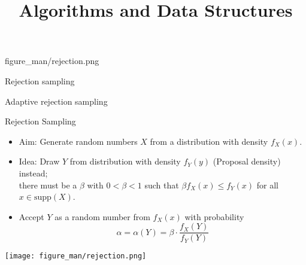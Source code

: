 \documentclass[11pt,compress,t,notes=noshow, xcolor=table]{beamer}
\title{Algorithms and Data Structures}
\begin{document}
{figure_man/rejection.png}
{
  \item Rejection sampling
  \item Adaptive rejection sampling
}

\begin{vbframe}{Rejection Sampling}
\begin{itemize}
\item Aim: Generate random numbers $X$ from a distribution with density $f_X(x)$.
\item Idea: Draw $Y$ from distribution with density $f_Y(y)$ (Proposal density) instead; \\
 there must be a $\beta$ with $0 < \beta < 1$ such that $\beta f_X(x) \leq f_Y(x)$ for all
  $x \in \mbox{supp}(X)$.
\item Accept $Y$ as a random number from $f_X(x)$ with probability
  $$
  \alpha = \alpha(Y) = \beta \cdot \frac{f_X(Y)}{f_Y(Y)}
  $$
\end{itemize}

\framebreak


\begin{center}
\texttt{[image: figure\_man/rejection.png]}
\end{center}







\end{vbframe}
\end{document}
